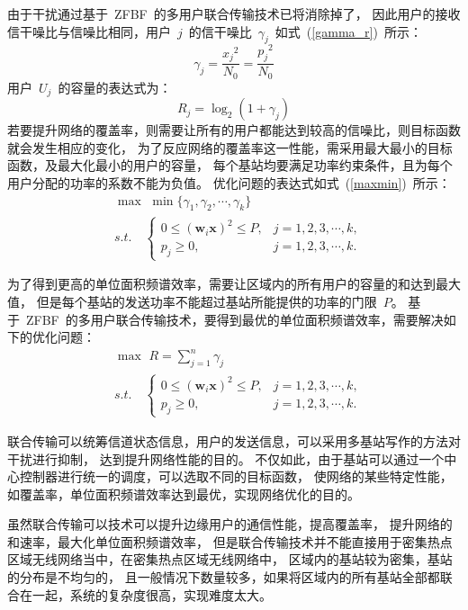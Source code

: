 由于干扰通过基于~ZFBF~的多用户联合传输技术已将消除掉了，
因此用户的接收信干噪比与信噪比相同，用户~$j$~的信干噪比~$\gamma_{j}$~如式~(\ref{gamma_r})~所示：
\begin{equation}\label{gamma_r}
  \gamma_j = \frac{{x_j}^2}{N_0}= \frac{{p_j}^2}{N_0}
\end{equation}
用户~$U_j$~的容量的表达式为：
\begin{equation}
  R_j = \log_2(1+\gamma_j)
\end{equation}
若要提升网络的覆盖率，则需要让所有的用户都能达到较高的信噪比，则目标函数就会发生相应的变化，
为了反应网络的覆盖率这一性能，需采用最大最小的目标函数，及最大化最小的用户的容量，
每个基站均要满足功率约束条件，且为每个用户分配的功率的系数不能为负值。
优化问题的表达式如式~(\ref{maxmin})~所示：
\begin{equation}\label{maxmin}
  \begin{aligned}
&\max\,\, \min\{\gamma_1, \gamma_2, \cdots, \gamma_k\}\\
&s.t.\quad
\begin{cases}
0\leq(\mathbf{w}_i\mathbf{x})^2\leq P, & j=1,2,3,\cdots,k, \\
p_j \geq 0, & j=1,2,3,\cdots,k.
\end{cases}
\end{aligned}
\end{equation}

为了得到更高的单位面积频谱效率，需要让区域内的所有用户的容量的和达到最大值，
但是每个基站的发送功率不能超过基站所能提供的功率的门限~$P$。
基于~ZFBF~的多用户联合传输技术，要得到最优的单位面积频谱效率，需要解决如下的优化问题：
\begin{equation}\label{opt_R}
  \begin{aligned}
&\max\,\, R=\sum_{j=1}^n \gamma_j\\
&s.t.\quad
\begin{cases}
0\leq(\mathbf{w}_i\mathbf{x})^2\leq P, & j=1,2,3,\cdots,k, \\
p_j \geq 0, & j=1,2,3,\cdots,k.
\end{cases}
\end{aligned}
\end{equation}

联合传输可以统筹信道状态信息，用户的发送信息，可以采用多基站写作的方法对干扰进行抑制，
达到提升网络性能的目的。
不仅如此，由于基站可以通过一个中心控制器进行统一的调度，可以选取不同的目标函数，
使网络的某些特定性能，如覆盖率，单位面积频谱效率达到最优，实现网络优化的目的。

虽然联合传输可以技术可以提升边缘用户的通信性能，提高覆盖率，
提升网络的和速率，最大化单位面积频谱效率，
但是联合传输技术并不能直接用于密集热点区域无线网络当中，在密集热点区域无线网络中，
区域内的基站较为密集，基站的分布是不均匀的，
且一般情况下数量较多，如果将区域内的所有基站全部都联合在一起，系统的复杂度很高，实现难度太大。

